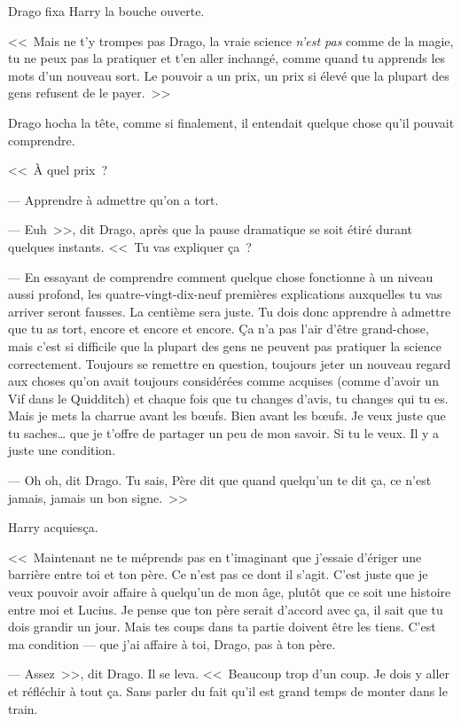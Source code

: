 Drago fixa Harry la bouche ouverte.

<<~Mais ne t'y trompes pas Drago, la vraie science \emph{n'est pas} comme de la magie, tu ne peux pas la pratiquer et t'en aller inchangé, comme quand tu apprends les mots d'un nouveau sort. Le pouvoir a un prix, un prix si élevé que la plupart des gens refusent de le payer.~>>

Drago hocha la tête, comme si finalement, il entendait quelque chose qu'il pouvait comprendre.

<<~À quel prix~?

--- Apprendre à admettre qu'on a tort.

--- Euh~>>, dit Drago, après que la pause dramatique se soit étiré durant quelques instants. <<~Tu vas expliquer ça~?

--- En essayant de comprendre comment quelque chose fonctionne à un niveau aussi profond, les quatre-vingt-dix-neuf premières explications auxquelles tu vas arriver seront fausses. La centième sera juste. Tu dois donc apprendre à admettre que tu as tort, encore et encore et encore. Ça n'a pas l'air d'être grand-chose, mais c'est si difficile que la plupart des gens ne peuvent pas pratiquer la science correctement. Toujours se remettre en question, toujours jeter un nouveau regard aux choses qu'on avait toujours considérées comme acquises (comme d'avoir un Vif dans le Quidditch) et chaque fois que tu changes d'avis, tu changes qui tu es. Mais je mets la charrue avant les bœufs. Bien avant les bœufs. Je veux juste que tu saches… que je t'offre de partager un peu de mon savoir. Si tu le veux. Il y a juste une condition.

--- Oh oh, dit Drago. Tu sais, Père dit que quand quelqu'un te dit ça, ce n'est jamais, jamais un bon signe.~>>

Harry acquiesça.

<<~Maintenant ne te méprends pas en t'imaginant que j'essaie d'ériger une barrière entre toi et ton père. Ce n'est pas ce dont il s'agit. C'est juste que je veux pouvoir avoir affaire à quelqu'un de mon âge, plutôt que ce soit une histoire entre moi et Lucius. Je pense que ton père serait d'accord avec ça, il sait que tu dois grandir un jour. Mais tes coups dans ta partie doivent être les tiens. C'est ma condition — que j'ai affaire à toi, Drago, pas à ton père.

--- Assez~>>, dit Drago. Il se leva. <<~Beaucoup trop d'un coup. Je dois y aller et réfléchir à tout ça. Sans parler du fait qu'il est grand temps de monter dans le train.


